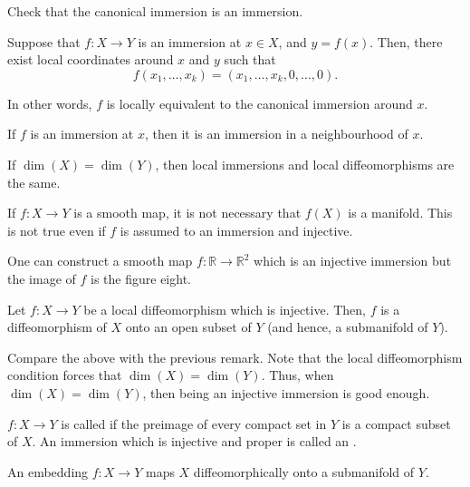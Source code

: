 Check that the canonical immersion is an immersion.

\begin{thm}
	Suppose that $f : X \to Y$ is an immersion at $x \in X$, and $y = f(x)$. Then, there exist local coordinates around $x$ and $y$ such that
	\begin{equation*} 
		f(x_{1}, \ldots, x_{k}) = (x_{1}, \ldots, x_{k}, 0, \ldots, 0).
	\end{equation*}

	In other words, $f$ is locally equivalent to the canonical immersion around $x$.
\end{thm}

\begin{cor}
	If $f$ is an immersion at $x$, then it is an immersion in a neighbourhood of $x$.
\end{cor}

\begin{rem}
	If $\dim(X) = \dim(Y)$, then local immersions and local diffeomorphisms are the same.
\end{rem}

\begin{rem} \label{rem:immersion-injective-not-embedding}
	If $f : X \to Y$ is a smooth map, it is not necessary that $f(X)$ is a manifold. This is not true even if $f$ is assumed to an immersion and injective. 

	One can construct a smooth map $f : \mathbb{R} \to \mathbb{R}^{2}$ which is an injective immersion but the image of $f$ is the figure eight.
\end{rem}

\begin{thm}
	Let $f : X \to Y$ be a local diffeomorphism which is injective. Then, $f$ is a diffeomorphism of $X$ onto an open subset of $Y$ (and hence, a submanifold of $Y$).
\end{thm}

Compare the above with the previous remark. Note that the local diffeomorphism condition forces that $\dim(X) = \dim(Y)$. Thus, when $\dim(X) = \dim(Y)$, then being an injective immersion is good enough.

\begin{defn}
	$f : X \to Y$ is called  if the preimage of every compact set in $Y$ is a compact subset of $X$. An immersion which is injective and proper is called an .
\end{defn}

\begin{thm}
	An embedding $f : X \to Y$ maps $X$ diffeomorphically onto a submanifold of $Y$.
\end{thm}

